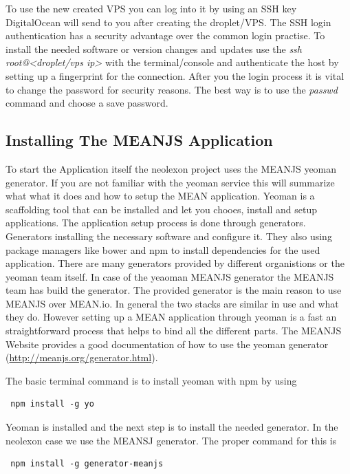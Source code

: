 To use the new created VPS you can log into it by using an SSH key DigitalOcean will send to you after creating the droplet/VPS. The SSH login authentication has a security
advantage over the common login practise. To install the needed software or version changes and updates use the \textit{ssh root@<droplet/vps ip>} with
the terminal/console and authenticate the host by setting up a fingerprint for the connection. After you the login process it is vital to change the password for
security reasons. The best way is to use the \textit{passwd} command and choose a save password.

\subsection{Installing The MEANJS Application}
To start the Application itself the neolexon project uses the MEANJS yeoman generator. If you are not familiar with the yeoman service this will summarize what what
it does and how to setup the MEAN application. Yeoman is a scaffolding tool that can be installed and let you chooes, install and setup applications. The
application setup process is done through generators. Generators installing the necessary software and configure it. They also using package managers like bower
and npm to install dependencies for the used application. There are many generators provided by different organistions or the yeoman team itself. In case of the
yeaoman MEANJS generator the MEANJS team has build the generator. The provided generator is the main reason to use MEANJS over MEAN.io. In general the two stacks
are similar in use and what they do. However setting up a MEAN application through yeoman is a fast an straightforward process that helps to bind all the different
parts. The MEANJS Website provides a good documentation of how to use the yeoman generator (\url{http://meanjs.org/generator.html}).

The basic terminal command is to install yeoman with npm by using

\begin{lstlisting}
 npm install -g yo
\end{lstlisting}

Yeoman is installed and the next step is to install the needed generator. In the neolexon case we use the MEANSJ generator. The proper command for this is

\begin{lstlisting}
 npm install -g generator-meanjs
\end{lstlisting}

